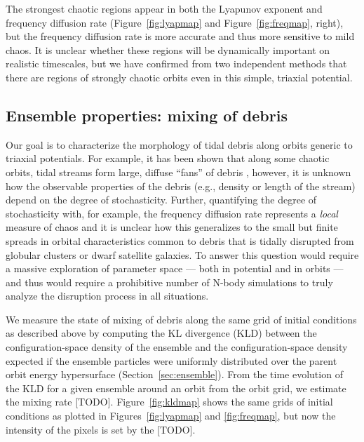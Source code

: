 \documentclass[letterpaper,12pt,preprint]{aastex}
\begin{document}
The strongest chaotic regions appear in both the Lyapunov exponent and frequency diffusion rate (Figure~\ref{fig:lyapmap} and Figure~\ref{fig:freqmap}, right), but the frequency diffusion rate is more accurate and thus more sensitive to mild chaos. It is unclear whether these regions will be dynamically important on realistic timescales, but we have confirmed from two independent methods that there are regions of strongly chaotic orbits even in this simple, triaxial potential.

\subsection{Ensemble properties: mixing of debris}

Our goal is to characterize the morphology of tidal debris along orbits generic to triaxial potentials. For example, it has been shown that along some chaotic orbits, tidal streams form large, diffuse ``fans'' of debris \citep[e.g.][]{fardal14, pearson15}, however, it is unknown how the observable properties of the debris (e.g., density or length of the stream) depend on the degree of stochasticity. Further, quantifying the degree of stochasticity with, for example, the frequency diffusion rate represents a \emph{local} measure of chaos and it is unclear how this generalizes to the small but finite spreads in orbital characteristics common to debris that is tidally disrupted from globular clusters or dwarf satellite galaxies. To answer this question would require a massive exploration of parameter space --- both in potential and in orbits --- and thus would require a prohibitive number of N-body simulations to truly analyze the disruption process in all situations.

We measure the state of mixing of debris along the same grid of initial conditions as described above by computing the KL divergence (KLD) between the configuration-space density of the ensemble and the configuration-space density expected if the ensemble particles were uniformly distributed over the parent orbit energy hypersurface (Section~\ref{sec:ensemble}). From the time evolution of the KLD for a given ensemble around an orbit from the orbit grid, we estimate the mixing rate [TODO]. Figure~\ref{fig:kldmap} shows the same grids of initial conditions as plotted in Figures~\ref{fig:lyapmap} and \ref{fig:freqmap}, but now the intensity of the pixels is set by the [TODO].

\end{document}
